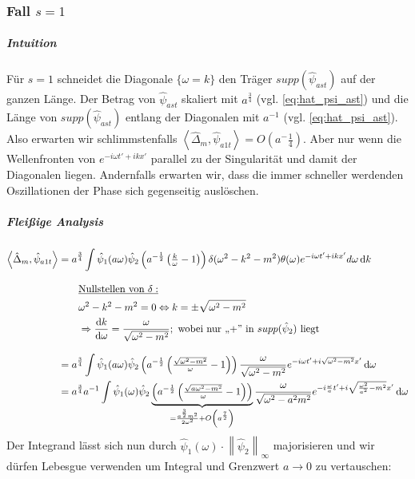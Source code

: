 \subsubsection*{Fall $s=1$}
\subparagraph*{Intuition}
Für $s=1$ schneidet die Diagonale $\{\omega = k\}$ den Träger $supp (\hat \psi_{ast})$ auf der ganzen Länge. Der Betrag von $\hat\psi_{ast}$ skaliert mit $a^{\frac{3}{4}}$ (vgl. \cref{eq:hat_psi_ast}) und die Länge von $supp (\hat \psi_{ast})$ entlang der Diagonalen mit $a^{-1}$ (vgl. \cref{eq:hat_psi_ast}). Also erwarten wir schlimmstenfalls $\left<\hat\Delta_m,  \hat \psi_{a1t}\right> = O\left(a^-{\frac{1}{4}}\right)$. Aber nur wenn die Wellenfronten von $e^{-i\omega t'+i k x'}$ parallel zu der Singularität und damit der Diagonalen liegen. Andernfalls erwarten wir, dass die immer schneller werdenden Oszillationen der Phase sich gegenseitig auslöschen.

\subparagraph*{Fleißige Analysis}
\begin{align}
    \left<\hat \Delta_m, \hat \psi_{a1t}\right> &=
        a^{\frac{3}{4}} \int \hat \psi_1(a\omega)
        \hat\psi_2\left(a^{-\frac{1}{2}} \left(\tfrac{k}{\omega}-1\right)\right)
        \delta (\omega^2 - k^2 - m^2) \theta(\omega)
        e^{-i\omega t' + ikx'} d \omega \mathop{}\!\mathrm{d} k \nonumber \\[2ex]
        & \kern 2em \underline{\textrm{Nullstellen von $\delta$}:}
        \nonumber \\
        & \kern 2em \omega^2 - k^2 - m^2 = 0 \Leftrightarrow k = \pm \sqrt{\omega^2-m^2}
        \nonumber \\
        & \kern 2em \Rightarrow \frac{\mathop{}\!\mathrm{d} k}{\mathop{}\!\mathrm{d} \omega} = \frac{\omega}{\sqrt{\omega^2-m^2}}; \textrm{   wobei nur ,,+'' in $supp (\hat \psi_2)$ liegt}
        \nonumber \\[2ex]
        &= a^{\frac{3}{4}} \int \hat\psi_1(a \omega)
        \hat\psi_2\left(a^{-\frac{1}{2}} \left(\tfrac{\sqrt{\omega^2-m^2}}{\omega}-1\right)\right)
        \frac{\omega}{\sqrt{\omega^2-m^2}}
        e^{-i\omega t' + i \sqrt{\omega^2-m^2}x'}
        \mathop{}\!\mathrm{d} \omega \nonumber \\
        &= a^{\frac{3}{4}} a^{-1} \int \hat\psi_1(\omega)
        \hat\psi_2
        \underbrace{
        \left(
            a^{-\frac{1}{2}} \left(\tfrac{\sqrt{a\omega^2-m^2}}{\omega}-1\right)
        \right)}_{= \frac{a^{\frac{3}{2}}m^2}{2 \omega^2}
                  + O\left(a^{\frac{7}{2}}\right)}
        \frac{\omega}{\sqrt{\omega^2-a^2 m^2}}
        e^{-i\frac{\omega}{a} t' + i \sqrt{\frac{\omega^2}{a^2}-m^2}x'}
        \mathop{}\!\mathrm{d} \omega \nonumber
\end{align}
Der Integrand lässt sich nun durch $\hat \psi_1(\omega) \cdot \left\lVert \hat\psi_2\right\lVert_\infty$ majorisieren und wir dürfen Lebesgue verwenden um Integral und Grenzwert $a \rightarrow 0$ zu vertauschen:


